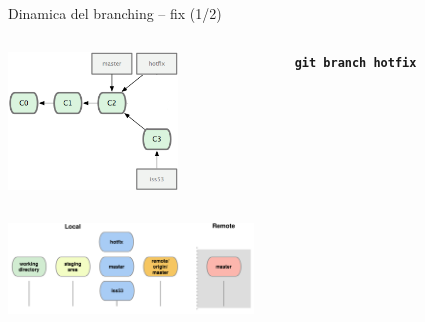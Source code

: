 \documentclass{beamer}
\begin{document}
\begin{frame}{\centerline{Dinamica del branching -- fix (1/2)}}
  \begin{columns}
    \begin{column}{0.6\linewidth}
      \begin{center}
        \includegraphics[width=4.5cm]{A2023.LavoroCondiviso/18333fig0313b-tn}
      \end{center}
    \end{column}
    \begin{column}{0.45\linewidth}
      \begin{center}
        \texttt{\textbf{git branch hotfix}}\\
      \end{center}
    \end{column}
  \end{columns}
  \begin{center}
    \includegraphics[width=6.5cm]{A2023.LavoroCondiviso/git-branch2}
  \end{center}
\end{frame}
\end{document}
